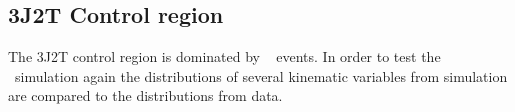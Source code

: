 
\clearpage

\subsection{3J2T Control region}

The 3J2T control region is dominated by \ttbar~ events. In order to test the \ttbar~simulation again the distributions of several kinematic variables from simulation are compared to the distributions from data. 


